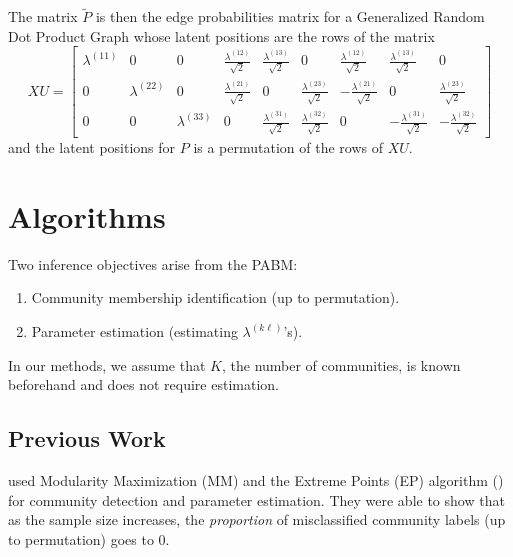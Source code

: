 \documentclass[12pt]{article}
\providecommand{\tightlist}{%
  \setlength{\itemsep}{0pt}\setlength{\parskip}{0pt}}
\begin{document}
\begin{example}
The matrix $\tilde{P}$ is then the edge probabilities matrix for a 
Generalized Random Dot Product Graph whose latent positions 
are the rows of the matrix
$$XU = \begin{bmatrix}
  \lambda^{(11)} & 0 & 0 &
  \frac{\lambda^{(12)}}{\sqrt{2}} & \frac{\lambda^{(13)}}{\sqrt{2}} & 0 &
  \frac{\lambda^{(12)}}{\sqrt{2}} & \frac{\lambda^{(13)}}{\sqrt{2}} & 0 \\
  0 & \lambda^{(22)} & 0 &
  \frac{\lambda^{(21)}}{\sqrt{2}} & 0 & \frac{\lambda^{(23)}}{\sqrt{2}} &
  -\frac{\lambda^{(21)}}{\sqrt{2}} & 0 & \frac{\lambda^{(23)}}{\sqrt{2}} \\
  0 & 0 & \lambda^{(33)} &
  0 & \frac{\lambda^{(31)}}{\sqrt{2}} & \frac{\lambda^{(32)}}{\sqrt{2}} &
  0 & -\frac{\lambda^{(31)}}{\sqrt{2}} & -\frac{\lambda^{(32)}}{\sqrt{2}}
\end{bmatrix}$$
and the latent positions for $P$ is a permutation of the rows of
$XU$. 
\end{example}

\hypertarget{methods}{%
\section{Algorithms}\label{methods}}

Two inference objectives arise from the PABM:

\begin{enumerate}
\def\labelenumi{\arabic{enumi}.}
\tightlist
\item
  Community membership identification (up to permutation).
\item
  Parameter estimation (estimating \(\lambda^{(k \ell)}\)'s).
\end{enumerate}

In our methods, we assume that \(K\), the number of communities, is
known beforehand and does not require estimation.

\hypertarget{related-work}{%
\subsection{Previous Work}\label{related-work}}

\citet{307cbeb9b1be48299388437423d94bf1} 
used Modularity Maximization (MM) and the Extreme Points (EP)
algorithm (\cite{le2016}) for community detection and parameter
estimation. They were able to show that as the sample size increases,
the {\em proportion} of misclassified community labels (up to permutation)
goes to 0.
\end{document}

